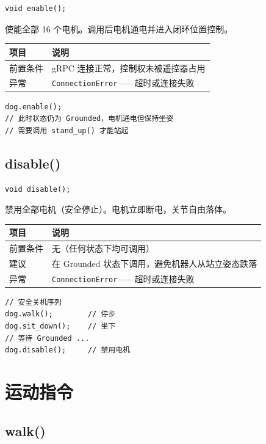 \documentclass[a4paper,11pt,openany]{book}
\begin{document}
\begin{lstlisting}[style=cpp,numbers=none]
void enable();
\end{lstlisting}

使能全部 16 个电机。调用后电机通电并进入闭环位置控制。

\begin{longtable}{ll}
\toprule
项目 & 说明 \\
\midrule
\endhead
前置条件 & gRPC 连接正常，控制权未被遥控器占用 \\
异常 & \texttt{ConnectionError}——超时或连接失败 \\
\bottomrule
\end{longtable}

\begin{lstlisting}[style=cpp]
dog.enable();
// 此时状态仍为 Grounded，电机通电但保持坐姿
// 需要调用 stand_up() 才能站起
\end{lstlisting}

\subsection{disable()}

\begin{lstlisting}[style=cpp,numbers=none]
void disable();
\end{lstlisting}

禁用全部电机（安全停止）。电机立即断电，关节自由落体。

\begin{longtable}{ll}
\toprule
项目 & 说明 \\
\midrule
\endhead
前置条件 & 无（任何状态下均可调用）\\
建议 & 在 Grounded 状态下调用，避免机器人从站立姿态跌落 \\
异常 & \texttt{ConnectionError}——超时或连接失败 \\
\bottomrule
\end{longtable}

\begin{lstlisting}[style=cpp]
// 安全关机序列
dog.walk();        // 停步
dog.sit_down();    // 坐下
// 等待 Grounded ...
dog.disable();     // 禁用电机
\end{lstlisting}

\section{运动指令}

\subsection{walk()}
\end{document}
